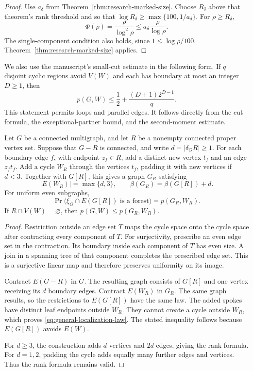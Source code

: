 \begin{proof}
Use $a_\delta$ from Theorem~\ref{thm:research-marked-size}.
Choose $R_\delta$ above that theorem's rank threshold and so that
$\log R_\delta\ge\max\{100,1/a_\delta\}$.
For $\rho\ge R_\delta$,
\[
 \Phi(\rho)=\frac{\rho}{\log^2\rho}
 \le a_\delta\frac{\rho}{\log\rho}.
\]
The single-component condition also holds, since $1\le\log\rho/100$.
Theorem~\ref{thm:research-marked-size} applies.
\end{proof}

We also use the manuscript's small-cut estimate in the following form.
If $q$ disjoint cyclic regions avoid $V(W)$ and each has boundary at most an integer $D\ge1$, then
\begin{equation}\label{eq:general-small-cut-input}
 p(G,W)\le\frac12+\frac{(D+1)2^{D-1}}{q}.
\end{equation}
This statement permits loops and parallel edges.
It follows directly from the cut formula, the exceptional-partner bound, and the second-moment estimate.

\begin{lemma}[Localization]\label{lem:general-localization}
Let $G$ be a connected multigraph, and let $R$ be a nonempty connected proper vertex set.
Suppose that $G-R$ is connected, and write $d=|\delta_G R|\ge1$.
For each boundary edge $f$, with endpoint $z_f\in R$, add a distinct new vertex $t_f$ and an edge $z_ft_f$.
Add a cycle $W_R$ through the vertices $t_f$, padding it with new vertices if $d<3$.
Together with $G[R]$, this gives a graph $G_R$ satisfying
\[
 |E(W_R)|=\max\{d,3\},\qquad
 \beta(G_R)=\beta(G[R])+d.
\]
For uniform even subgraphs,
\begin{equation}\label{eq:general-localization-law}
 \Pr\bigl(\xi_G\cap E(G[R])\text{ is a forest}\bigr)=p(G_R,W_R).
\end{equation}
If $R\cap V(W)=\varnothing$, then $p(G,W)\le p(G_R,W_R)$.
\end{lemma}

\begin{proof}
Restriction outside an edge set $T$ maps the cycle space onto the cycle space after contracting every component of $T$.
For surjectivity, prescribe an even edge set in the contraction.
Its boundary inside each component of $T$ has even size.
A join in a spanning tree of that component completes the prescribed edge set.
This is a surjective linear map and therefore preserves uniformity on its image.

Contract $E(G-R)$ in $G$.
The resulting graph consists of $G[R]$ and one vertex receiving its $d$ boundary edges.
Contract $E(W_R)$ in $G_R$.
The same graph results, so the restrictions to $E(G[R])$ have the same law.
The added spokes have distinct leaf endpoints outside $W_R$.
They cannot create a cycle outside $W_R$, which proves \eqref{eq:general-localization-law}.
The stated inequality follows because $E(G[R])$ avoids $E(W)$.

For $d\ge3$, the construction adds $d$ vertices and $2d$ edges, giving the rank formula.
For $d=1,2$, padding the cycle adds equally many further edges and vertices.
Thus the rank formula remains valid.
\end{proof}

